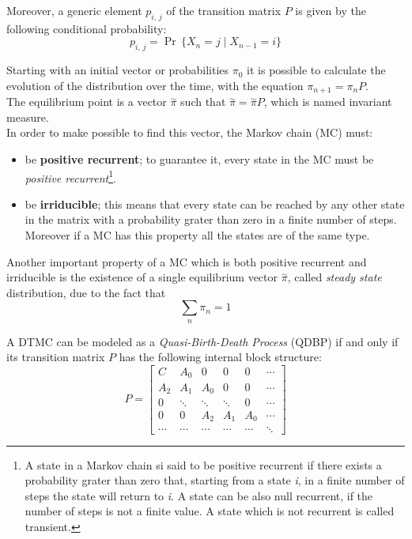 Moreover, a generic element \(p_{i,\,j}\) of the transition matrix \( P \) is given by the following conditional probability:
\begin{equation*}
  p_{i,\,j} = \Pr\,\{X_{n} = j \mid X_{n-1} = i\}
\end{equation*}

Starting with an initial vector or probabilities \( \pi_{0} \) it is possible to calculate the evolution of the distribution over the time, with the equation \( \pi_{n+1} = \pi_{n}P \).\\
The equilibrium point is a vector \( \overset{\sim}{\pi} \) such that \( \overset{\sim}{\pi} = \overset{\sim}{\pi}P \), which is named invariant measure.\\
In order to make possible to find this vector, the Markov chain (MC) must:
\begin{itemize}
  \item be \textbf{positive recurrent}; to guarantee it, every state in the MC must be \emph{positive recurrent}\footnote{A state in a Markov chain si said to be positive recurrent if there exists a probability grater than zero that, starting from a state \emph{i}, in a finite number of steps the state will return to \emph{i}. A state can be also null recurrent, if the number of steps is not a finite value. A state which is not recurrent is called transient.}. 
  \item be \textbf{irriducible}; this means that every state can be reached by any other state in the matrix with a probability grater than zero in a finite number of steps. Moreover if a MC has this property all the states are of the same type.  
\end{itemize}

Another important property of a MC which is both positive recurrent and irriducible is the existence of a single equilibrium vector \( \overset{\sim}{\pi} \), called \emph{steady state} distribution, due to the fact that
\begin{equation*}
  \displaystyle\sum_{n} \pi_{n} = 1
\end{equation*}

A DTMC can be modeled as a \emph{Quasi-Birth-Death Process} (QDBP) if and only if its transition matrix \( P \) has the following internal block structure:
\begin{equation*}
  P = 
  \begin{bmatrix}
    C & A_{0} & 0 & 0 & 0 & \cdots \\
    A_{2} & A_{1} & A_{0} & 0 & 0 & \cdots \\
    0 & \ddots & \ddots & \ddots & 0 & \cdots \\
    0 & 0 & A_{2} & A_{1} & A_{0} & \cdots \\
    \cdots & \cdots & \cdots & \cdots & \cdots & \ddots
  \end{bmatrix}
\end{equation*}

